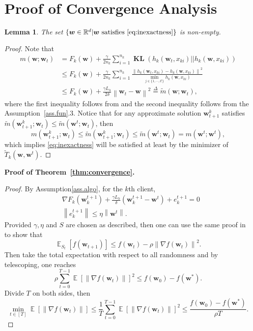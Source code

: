 \documentclass{article} %
\newcommand{\w}{\boldsymbol{w}}
\DeclareMathOperator{\E}{\mathbb{E}}
\DeclareMathOperator{\KL}{\boldsymbol{\mathbf{KL}}}
\newcommand{\R}[1]{\mathbb{R}^{#1}}
\newcommand{\norm}[1]{\left\|{#1}\right\|}
\newtheorem{lemma}[theorem]{Lemma}
\begin{document}
\section{Proof of Convergence Analysis}
\begin{lemma}\label{lemma:wellposed}
The set $\{\w\in\R{d}| \w \text{ satisfies } \eqref{eq:inexactness}\}$ is non-empty.
\end{lemma}
\begin{proof}
Note that 
\begin{align*}
    m(\w;\w_{t})
    &=F_k(\w) + \frac{\gamma}{2n_k}\sum_{i=1}^{n_k} \KL(h_k(\w_{t},x_{ki}) || h_k(\w,x_{ki}))\\
    &\leq F_k(\w) + \frac{\gamma}{2n_k}\sum_{i=1}^{n_k} \frac{\norm{h_k(\w_t,x_{ki}) - h_k(\w,x_{ki}) }^2}{\min_{j\in\{1,\cdots, \mathcal{C}\}} h_k(\w,x_{ki})}\\
    &\leq F_k(\w) + \frac{\gamma L_h}{2\delta}\norm{\w_t - \w }^2\overset{\Delta}{=}\tilde m(\w;\w_{t}),
 \end{align*}
 where the first inequality follows from \cite[Lemma 11.6]{klemela2009smoothing} and the second inequality follows from the Assumption~\ref{ass.fun}.3. Notice that for any approximate solution $\w^k_{t+1}$ satisfies $\tilde m(\w^k_{t+1};\w_{t}) \leq \tilde m(\w^t;\w_{t})$, then
$$
m(\w^k_{t+1};\w_t) \leq \tilde m(\w^k_{t+1};\w_{t}) \leq \tilde m(\w^t;\w_{t}) = m(\w^t;\w^t),
$$
which implies \eqref{eq:inexactness} will be satisfied at least by the minimizer of $\tilde T_k(\w, \w^t)$.
\end{proof}

\textbf{Proof of Theorem~\ref{thm:convergence}.}
\begin{proof}
By Assumption\ref{ass.algo}, for the $k$th client, 
$$
\begin{aligned}
 & \nabla F_k(\w_{k}^{t+1}) + \frac{\gamma L_h}{\delta}(\w_{k}^{t+1}-\w^t) + e_{k}^{t+1} = 0\\
 & \norm{e_{k}^{t+1}} \leq \eta \norm{\w^{t}}.
\end{aligned}
$$
Provided $\gamma, \eta$ and $S$ are chosen as described, then one can use the same proof in \cite[Theorem 4]{li2018federated} to show that
$$
\E_{S_t}[f(\w_{t+1})] \leq f(\w_t) - \rho \norm{\nabla f(\w_t)}^2.
$$
Then take the total expectation with respect to all randomness and by telescoping, one reaches
$$
\rho \sum_{t=0}^{T-1}\E[\norm{\nabla f(\w_t)}]^2 \leq f(\w_0)-f(\w^*).
$$
Divide $T$ on both sides, then
$$
\min_{t\in[T]} \E[\norm{\nabla f(\w_t)}]\leq \frac{1}{T}\sum_{t=0}^{T-1}\E[\norm{\nabla f(\w_t)}]^2  \leq \frac{f(\w_0)-f(\w^*)}{\rho T}.
$$
\end{proof}
\end{document}
